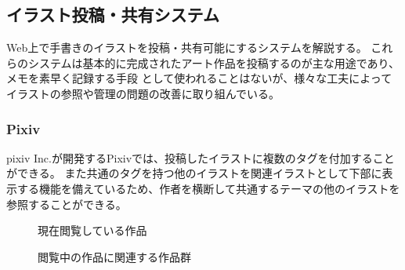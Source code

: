 \subsection{イラスト投稿・共有システム}
Web上で手書きのイラストを投稿・共有可能にするシステムを解説する。
これらのシステムは基本的に完成されたアート作品を投稿するのが主な用途であり、メモを素早く記録する手段
として使われることはないが、様々な工夫によってイラストの参照や管理の問題の改善に取り組んでいる。

\subsubsection{Pixiv}

pixiv Inc.が開発するPixivでは、投稿したイラストに複数のタグを付加することができる。
また共通のタグを持つ他のイラストを関連イラストとして下部に表示する機能を備えているため、作者を横断して共通するテーマの他のイラストを参照することができる。

\begin{figure}[htbp] \begin{minipage}{0.5\hsize}
                         \begin{center} 
                         \end{center} \caption{現在閲覧している作品} \label{fig:pixiv1}
\end{minipage} \begin{minipage}{0.5\hsize}
                   \begin{center} 
                   \end{center} \caption{閲覧中の作品に関連する作品群} \label{fig:pixiv2}
\end{minipage}
\end{figure}


